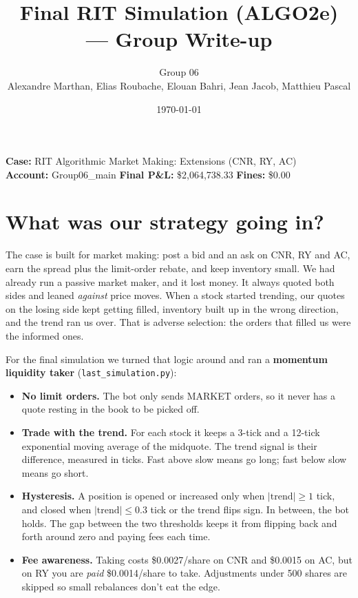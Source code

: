 \documentclass[11pt]{article}
\title{\vspace{-2em}Final RIT Simulation (ALGO2e) --- Group Write-up}
\author{Group 06\\ \small Alexandre Marthan, Elias Roubache, Elouan Bahri, Jean Jacob, Matthieu Pascal}
\date{\today}
\begin{document}
\maketitle
\vspace{-1em}

\noindent\textbf{Case:} RIT Algorithmic Market Making: Extensions (CNR, RY, AC) \\
\textbf{Account:} Group06\_main \quad\textbar\quad
\textbf{Final P\&L:} \$2,064,738.33 \quad\textbar\quad
\textbf{Fines:} \$0.00

\section{What was our strategy going in?}

The case is built for market making: post a bid and an ask on CNR, RY and AC,
earn the spread plus the limit-order rebate, and keep inventory small. We had
already run a passive market maker, and it lost money. It always quoted both
sides and leaned \emph{against} price moves. When a stock started trending, our
quotes on the losing side kept getting filled, inventory built up in the wrong
direction, and the trend ran us over. That is adverse selection: the orders that
filled us were the informed ones.

For the final simulation we turned that logic around and ran a \textbf{momentum
liquidity taker} (\texttt{last\_simulation.py}):

\begin{itemize}[leftmargin=1.4em, itemsep=0.2em]
  \item \textbf{No limit orders.} The bot only sends MARKET orders, so it never has
        a quote resting in the book to be picked off.
  \item \textbf{Trade with the trend.} For each stock it keeps a 3-tick and a 12-tick
        exponential moving average of the midquote. The trend signal is their
        difference, measured in ticks. Fast above slow means go long; fast below
        slow means go short.
  \item \textbf{Hysteresis.} A position is opened or increased only when
        $|\text{trend}| \ge 1$ tick, and closed when $|\text{trend}| \le 0.3$ tick or
        the trend flips sign. In between, the bot holds. The gap between the two
        thresholds keeps it from flipping back and forth around zero and paying
        fees each time.
  \item \textbf{Fee awareness.} Taking costs \$0.0027/share on CNR and \$0.0015 on
        AC, but on RY you are \emph{paid} \$0.0014/share to take. Adjustments
        under 500 shares are skipped so small rebalances don't eat the edge.
\end{itemize}
\end{document}
